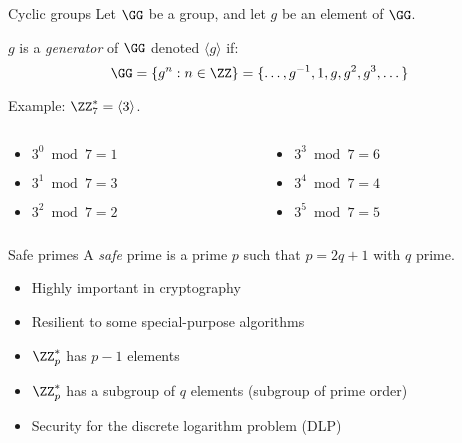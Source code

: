 \begin{frame}{Cyclic groups}
  \pause
  Let $\GG$ be a group, and let $g$ be an element of $\GG$.

  $g$ is a \emph{generator} of $\GG$ denoted $\langle g\rangle$ if:
  \[
    \GG = \{g^n:n\in\ZZ\} = \{\dots, g^{-1}, 1, g, g^2, g^3, \dots\}
  \]

  \pause
  Example: $\ZZ_7^* = \langle 3\rangle$.
  \pause
  \begin{columns}
    \begin{column}{0.3\textwidth}
      \begin{itemize}
        \item $3^0 \bmod{7} = 1$
        \item $3^1 \bmod{7} = 3$
        \item $3^2 \bmod{7} = 2$
      \end{itemize}
    \end{column}
    \begin{column}{0.3\textwidth}
      \begin{itemize}
        \item $3^3 \bmod{7} = 6$
        \item $3^4 \bmod{7} = 4$
        \item $3^5 \bmod{7} = 5$
      \end{itemize}
    \end{column}
  \end{columns}
\end{frame}

\begin{frame}{Safe primes}
  A \emph{safe} prime is a prime $p$ such that $p = 2q + 1$ with $q$ prime.
  \begin{itemize}[<+(1)->]
    \item Highly important in cryptography
    \item Resilient to some special-purpose algorithms
    \item $\ZZ_p^*$ has $p-1$ elements
    \item $\ZZ_p^*$ has a subgroup of $q$ elements (subgroup of prime order)
    \item Security for the discrete logarithm problem (DLP)
  \end{itemize}
\end{frame}

